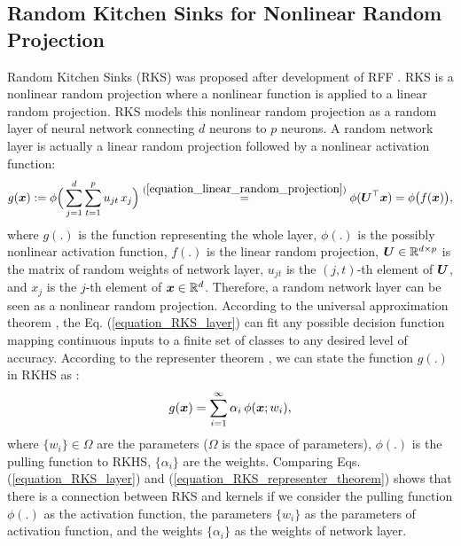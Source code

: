 \documentclass{article}
\def\b{\ensuremath\boldsymbol}
\begin{document}
\subsection{Random Kitchen Sinks for Nonlinear Random Projection}


Random Kitchen Sinks (RKS) \cite{rahimi2008weighted} was proposed after development of RFF \cite{rahimi2007random}. 
RKS is a nonlinear random projection where a nonlinear function is applied to a linear random projection. 
RKS models this nonlinear random projection as a random layer of neural network connecting $d$ neurons to $p$ neurons. 
A random network layer is actually a linear random projection followed by a nonlinear activation function:
\begin{align}\label{equation_RKS_layer}
g(\b{x}) := \phi\Big(\sum_{j=1}^d \sum_{t=1}^p u_{jt}\, x_j\Big) \overset{(\ref{equation_linear_random_projection})}{=} \phi(\b{U}^\top \b{x}) = \phi\big(f(\b{x})\big),
\end{align}
where $g(.)$ is the function representing the whole layer, $\phi(.)$ is the possibly nonlinear activation function, $f(.)$ is the linear random projection, $\b{U} \in \mathbb{R}^{d \times p}$ is the matrix of random weights of network layer, $u_{jt}$ is the $(j,t)$-th element of $\b{U}$, and $x_j$ is the $j$-th element of $\b{x} \in \mathbb{R}^d$. 
Therefore, a random network layer can be seen as a nonlinear random projection.
According to the universal approximation theorem \cite{hornik1989multilayer,huang2006universal}, the Eq. (\ref{equation_RKS_layer}) can fit any possible decision function mapping continuous inputs to a finite set of classes to any desired level of accuracy.  
According to the representer theorem \cite{aizerman1964theoretical}, we can state the function $g(.)$ in RKHS as \cite{ghojogh2021reproducing}:
\begin{align}\label{equation_RKS_representer_theorem}
g(\b{x}) = \sum_{i=1}^\infty \alpha_i\, \phi(\b{x}; w_i),
\end{align}
where $\{w_i\} \in \Omega$ are the parameters ($\Omega$ is the space of parameters), $\phi(.)$ is the pulling function to RKHS, $\{\alpha_i\}$ are the weights. 
Comparing Eqs. (\ref{equation_RKS_layer}) and (\ref{equation_RKS_representer_theorem}) shows that there is a connection between RKS and kernels \cite{rahimi2008uniform} if we consider the pulling function $\phi(.)$ as the activation function, the parameters $\{w_i\}$ as the parameters of activation function, and the weights $\{\alpha_i\}$ as the weights of network layer. 
\end{document}
